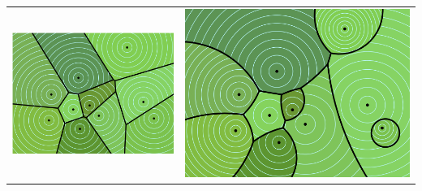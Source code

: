 \documentclass[10pt,landscape]{article}
\begin{document}
\begin{multicols}{3}
\begin{tabular}{@{}p{}@{\hskip 0.5cm}@{}p{}@{}}
\includegraphics[width=\linewidth/6*5]{Voronoi_LDA.png} & \includegraphics[width=\linewidth/6*5]{Voronoi_QDA.png} \\

\end{tabular}
\end{multicols}
\end{document}
